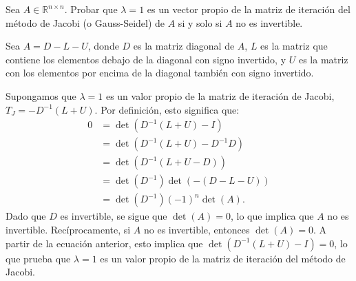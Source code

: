 \begin{homeworkProblem}
  Sea $A \in \mathbb{R}^{n\times n}$. Probar que $ \lambda= 1$ es un vector propio de la matriz de iteración del método de Jacobi (o Gauss-Seidel) de $A$ si y solo si $A$ no es invertible.
  \begin{solucion}
    Sea \( A = D - L - U \), donde \( D \) es la matriz diagonal de \( A \), \( L \) es la matriz que contiene los elementos debajo de la diagonal con signo invertido, y \( U \) es la matriz con los elementos por encima de la diagonal también con signo invertido.  

Supongamos que \( \lambda = 1 \) es un valor propio de la matriz de iteración de Jacobi, \( T_J = -D^{-1}(L+U) \). Por definición, esto significa que:
\begin{align*}
    0 &= \det(D^{-1}(L+U) - I) \\
      &= \det(D^{-1}(L+U) - D^{-1}D) \\
      &= \det(D^{-1}(L+U - D)) \\
      &= \det(D^{-1}) \det(-(D - L - U)) \\
      &= \det(D^{-1}) (-1)^n \det(A).
\end{align*}
Dado que \( D \) es invertible, se sigue que \( \det(A) = 0 \), lo que implica que \( A \) no es invertible.  
Recíprocamente, si \( A \) no es invertible, entonces \( \det(A) = 0 \). A partir de la ecuación anterior, esto implica que \( \det(D^{-1}(L+U) - I) = 0 \), lo que prueba que \( \lambda = 1 \) es un valor propio de la matriz de iteración del método de Jacobi.
  \end{solucion}
\end{homeworkProblem}
